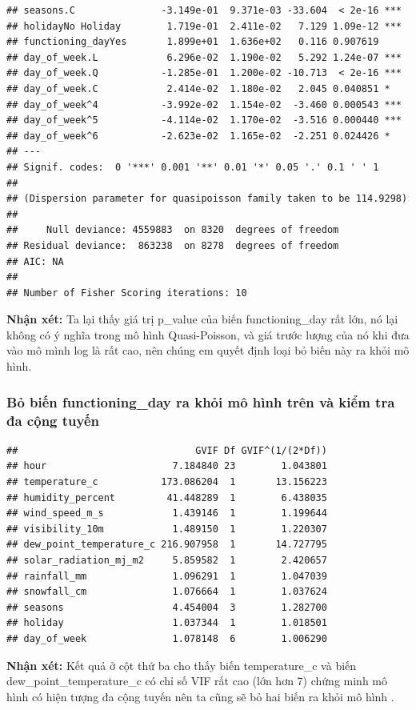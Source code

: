 \documentclass[
  11pt,
  letterpaper,
]{article}
\begin{document}
\begin{verbatim}
## seasons.C               -3.149e-01  9.371e-03 -33.604  < 2e-16 ***
## holidayNo Holiday        1.719e-01  2.411e-02   7.129 1.09e-12 ***
## functioning_dayYes       1.899e+01  1.636e+02   0.116 0.907619    
## day_of_week.L            6.296e-02  1.190e-02   5.292 1.24e-07 ***
## day_of_week.Q           -1.285e-01  1.200e-02 -10.713  < 2e-16 ***
## day_of_week.C            2.414e-02  1.180e-02   2.045 0.040851 *  
## day_of_week^4           -3.992e-02  1.154e-02  -3.460 0.000543 ***
## day_of_week^5           -4.114e-02  1.170e-02  -3.516 0.000440 ***
## day_of_week^6           -2.623e-02  1.165e-02  -2.251 0.024426 *  
## ---
## Signif. codes:  0 '***' 0.001 '**' 0.01 '*' 0.05 '.' 0.1 ' ' 1
## 
## (Dispersion parameter for quasipoisson family taken to be 114.9298)
## 
##     Null deviance: 4559883  on 8320  degrees of freedom
## Residual deviance:  863238  on 8278  degrees of freedom
## AIC: NA
## 
## Number of Fisher Scoring iterations: 10
\end{verbatim}

\textbf{Nhận xét:} Ta lại thấy giá trị p\_value của biến functioning\_day rất lớn, nó lại không có ý nghĩa trong mô hình Quasi-Poisson, và giá trước lượng của nó khi đưa vào mô mình log là rất cao, nên chúng em quyết định loại bỏ biến này ra khỏi mô hình.

\subsubsection{Bỏ biến functioning\_day ra khỏi mô hình trên và kiểm tra đa cộng tuyến}

\begin{verbatim}
##                               GVIF Df GVIF^(1/(2*Df))
## hour                      7.184840 23        1.043801
## temperature_c           173.086204  1       13.156223
## humidity_percent         41.448289  1        6.438035
## wind_speed_m_s            1.439146  1        1.199644
## visibility_10m            1.489150  1        1.220307
## dew_point_temperature_c 216.907958  1       14.727795
## solar_radiation_mj_m2     5.859582  1        2.420657
## rainfall_mm               1.096291  1        1.047039
## snowfall_cm               1.076664  1        1.037624
## seasons                   4.454004  3        1.282700
## holiday                   1.037344  1        1.018501
## day_of_week               1.078148  6        1.006290
\end{verbatim}

\textbf{Nhận xét:} Kết quả ở cột thứ ba cho thấy biến temperature\_c và biến dew\_point\_temperature\_c có chỉ số VIF rất cao (lớn hơn 7) chứng minh mô hình có hiện tượng đa cộng tuyến nên ta cũng sẽ bỏ hai biến ra khỏi mô hình .
\end{document}
